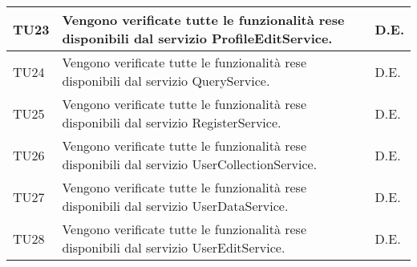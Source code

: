 \begin{center}
\begin{longtable}{|p{2cm}|p{7cm}|p{2cm}|}
\midrule
TU23
& Vengono verificate tutte le funzionalità rese disponibili dal servizio ProfileEditService.
& D.E.\\


\midrule
TU24
& Vengono verificate tutte le funzionalità rese disponibili dal servizio QueryService.
& D.E.\\


\midrule
TU25
& Vengono verificate tutte le funzionalità rese disponibili dal servizio RegisterService.
& D.E.\\


\midrule
TU26
& Vengono verificate tutte le funzionalità rese disponibili dal servizio UserCollectionService.
& D.E.\\

\midrule
TU27
& Vengono verificate tutte le funzionalità rese disponibili dal servizio UserDataService.
& D.E.\\

\midrule
TU28
& Vengono verificate tutte le funzionalità rese disponibili dal servizio UserEditService.
& D.E.\\



\end{longtable}
\end{center}

